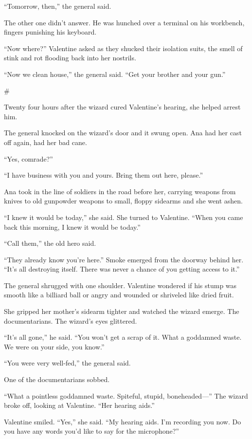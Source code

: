 “Tomorrow, then,” the general said.

The other one didn’t answer. He was hunched over a terminal on his
workbench, fingers punishing his keyboard.

“Now where?” Valentine asked as they shucked their isolation suits,
the smell of stink and rot flooding back into her nostrils.

“Now we clean house,” the general said. “Get your brother and your
gun.”

\#

Twenty four hours after the wizard cured Valentine’s hearing, she
helped arrest him.

The general knocked on the wizard’s door and it swung open. Ana had
her cast off again, had her bad cane.

“Yes, comrade?”

“I have business with you and yours. Bring them out here, please.”

Ana took in the line of soldiers in the road before her, carrying
weapons from knives to old gunpowder weapons to small, floppy
sidearms and she went ashen.

“I knew it would be today,” she said. She turned to Valentine.
“When you came back this morning, I knew it would be today.”

“Call them,” the old hero said.

“They already know you’re here.” Smoke emerged from the doorway
behind her. “It’s all destroying itself. There was never a chance
of you getting access to it.”

The general shrugged with one shoulder. Valentine wondered if his
stump was smooth like a billiard ball or angry and wounded or
shriveled like dried fruit.

She gripped her mother’s sidearm tighter and watched the wizard
emerge. The documentarians. The wizard’s eyes glittered.

“It’s all gone,” he said. “You won’t get a scrap of it. What a
goddamned waste. We were on your side, you know.”

“You were very well-fed,” the general said.

One of the documentarians sobbed.

“What a pointless goddamned waste. Spiteful, stupid, boneheaded—”
The wizard broke off, looking at Valentine. “Her hearing aids.”

Valentine smiled. “Yes,” she said. “My hearing aids. I’m recording
you now. Do you have any words you’d like to say for the
microphone?”

